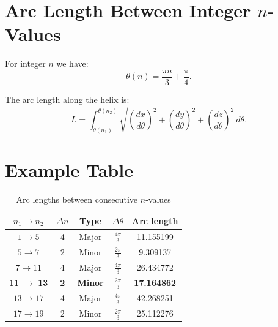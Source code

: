 \section{Arc Length Between Integer \texorpdfstring{$n$}{n}-Values}

For integer $n$ we have:
\begin{equation}
\theta(n) = \frac{\pi n}{3} + \frac{\pi}{4}.
\end{equation}

The arc length along the helix is:
\begin{equation}
L = \int_{\theta(n_1)}^{\theta(n_2)}
\sqrt{
\left(\frac{dx}{d\theta}\right)^2
+
\left(\frac{dy}{d\theta}\right)^2
+
\left(\frac{dz}{d\theta}\right)^2
}\, d\theta.
\end{equation}

\section{Example Table}

\begin{table}[ht]
\centering
\caption{Arc lengths between consecutive $n$-values}
\begin{tabular}{ccccc}
\toprule
$n_1 \to n_2$ & $\Delta n$ & Type & $\Delta\theta$ & Arc length \\
\midrule
$1 \to 5$ & 4 & Major & $\frac{4\pi}{3}$ & 11.155199 \\
$5 \to 7$ & 2 & Minor & $\frac{2\pi}{3}$ & 9.309137 \\
$7 \to 11$ & 4 & Major & $\frac{4\pi}{3}$ & 26.434772 \\
\rowcolor{yellow!30}
\textbf{11} $\to$ \textbf{13} & \textbf{2} & \textbf{Minor} & $\frac{2\pi}{3}$ & \textbf{17.164862} \\
$13 \to 17$ & 4 & Major & $\frac{4\pi}{3}$ & 42.268251 \\
$17 \to 19$ & 2 & Minor & $\frac{2\pi}{3}$ & 25.112276 \\
\bottomrule
\end{tabular}
\end{table}

